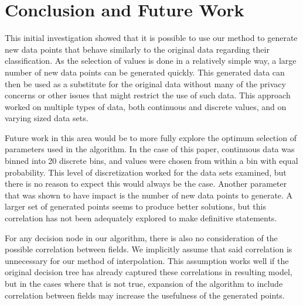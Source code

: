 \documentclass{sig-alternate}
\begin{document}
\section{Conclusion and Future Work}
This initial investigation showed that it is possible to use our method to generate new data points that behave similarly to the original data regarding their classification. As the selection of values is done in a relatively simple way, a large number of new data points can be generated quickly. This generated data can then be used as a substitute for the original data without many of the privacy concerns or other issues that might restrict the use of such data. This approach worked on multiple types of data, both continuous and discrete values, and on varying sized data sets.

Future work in this area would be to more fully explore the optimum selection of parameters used in the algorithm. In the case of this paper, continuous data was binned into 20 discrete bins, and values were chosen from within a bin with equal probability. This level of discretization worked for the data sets examined, but there is no reason to expect this would always be the case. Another parameter that was shown to have impact is the number of new data points to generate. A larger set of generated points seems to produce better solutions, but this correlation has not been adequately explored to make definitive statements.

For any decision node in our algorithm, there is also no consideration of the possible correlation between fields. We implicitly assume that said correlation is unnecessary for our method of interpolation. This assumption works well if the original decision tree has already captured these correlations in resulting model, but in the cases where that is not true, expansion of the algorithm to include correlation between fields may increase the usefulness of the generated points. 


%

%
\end{document}
